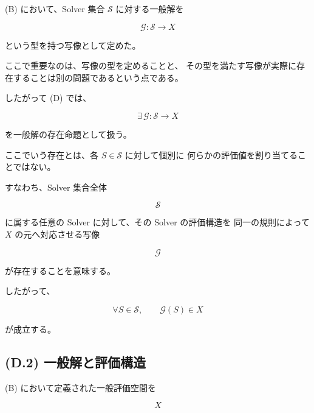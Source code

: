 \documentclass[a4paper,11pt]{article}
\newcommand{\Solver}{\mathcal{S}}
\begin{document}
(B) において、Solver 集合 $\Solver$ に対する一般解を

\begin{equation}
    \mathcal{G}:
    \Solver
    \longrightarrow
    X
    \label{eq:D-general-solution-map}
\end{equation}

という型を持つ写像として定めた。

ここで重要なのは、写像の型を定めることと、
その型を満たす写像が実際に存在することは別の問題であるという点である。

したがって (D) では、

\begin{equation}
    \boxed{
        \exists\,
        \mathcal{G}:
        \Solver
        \longrightarrow
        X
    }
    \label{eq:D-existence}
\end{equation}

を一般解の存在命題として扱う。

ここでいう存在とは、各 $S\in\Solver$ に対して個別に
何らかの評価値を割り当てることではない。

すなわち、Solver 集合全体

\begin{equation}
    \Solver
\end{equation}

に属する任意の Solver に対して、その Solver の評価構造を
同一の規則によって $X$ の元へ対応させる写像

\begin{equation}
    \mathcal{G}
\end{equation}

が存在することを意味する。

したがって、

\begin{equation}
    \forall S\in\Solver,
    \qquad
    \mathcal{G}(S)\in X
    \label{eq:D-pointwise-existence}
\end{equation}

が成立する。


\subsection{(D.2) 一般解と評価構造}
\label{subsec:D2}

(B) において定義された一般評価空間を

\begin{equation}
    X
\end{equation}
\end{document}
